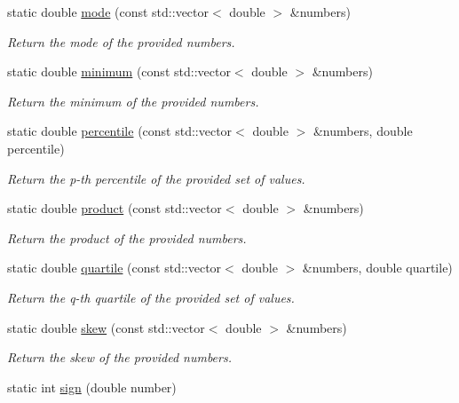 \begin{DoxyCompactItemize}
static double \hyperlink{classmultiscale_1_1Numeric_a09dc6e20116ac163389d3b07a99618e1}{mode} (const std\-::vector$<$ double $>$ \&numbers)
\begin{DoxyCompactList}\small\item\em Return the mode of the provided numbers. \end{DoxyCompactList}\item 
static double \hyperlink{classmultiscale_1_1Numeric_a1ba7305dcaa1d1baf17946beb233145d}{minimum} (const std\-::vector$<$ double $>$ \&numbers)
\begin{DoxyCompactList}\small\item\em Return the minimum of the provided numbers. \end{DoxyCompactList}\item 
static double \hyperlink{classmultiscale_1_1Numeric_aff0c6b0c3d82bec3761a5e2d08394513}{percentile} (const std\-::vector$<$ double $>$ \&numbers, double percentile)
\begin{DoxyCompactList}\small\item\em Return the p-\/th percentile of the provided set of values. \end{DoxyCompactList}\item 
static double \hyperlink{classmultiscale_1_1Numeric_af07966e00665420d17a8f4d2cd1d74b4}{product} (const std\-::vector$<$ double $>$ \&numbers)
\begin{DoxyCompactList}\small\item\em Return the product of the provided numbers. \end{DoxyCompactList}\item 
static double \hyperlink{classmultiscale_1_1Numeric_a127a2b3e5e659b4e493767ba23fc45da}{quartile} (const std\-::vector$<$ double $>$ \&numbers, double quartile)
\begin{DoxyCompactList}\small\item\em Return the q-\/th quartile of the provided set of values. \end{DoxyCompactList}\item 
static double \hyperlink{classmultiscale_1_1Numeric_a3e6b145db3ae9d7d21c3992353211125}{skew} (const std\-::vector$<$ double $>$ \&numbers)
\begin{DoxyCompactList}\small\item\em Return the skew of the provided numbers. \end{DoxyCompactList}\item 
static int \hyperlink{classmultiscale_1_1Numeric_a2b3058c5ad27aaaef338a29b96cdbced}{sign} (double number)

\end{DoxyCompactItemize}
